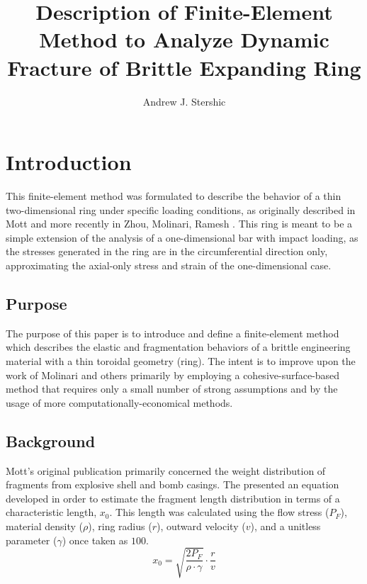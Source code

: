 \documentclass[12pt,a4paper]{article}
\title{Description of Finite-Element Method to Analyze Dynamic Fracture of Brittle Expanding Ring}
\author{Andrew J. Stershic}
\begin{document}
\maketitle

\section{Introduction}

This finite-element method was formulated to describe the behavior of a thin two-dimensional ring under specific loading conditions, as originally described in Mott \cite{Mott1947} and more recently in Zhou, Molinari, Ramesh \cite{ZhouCMS2006}. This ring is meant to be a simple extension of the analysis of a one-dimensional bar with impact loading, as the stresses generated in the ring are in the circumferential direction only, approximating the axial-only stress and strain of the one-dimensional case.

\subsection{Purpose}

The purpose of this paper is to introduce and define a finite-element method which describes the elastic and fragmentation behaviors of a brittle engineering material with a thin toroidal geometry (ring). The intent is to improve upon the work of Molinari and others primarily by employing a cohesive-surface-based method that requires only a small number of strong assumptions and by the usage of more computationally-economical methods.

\subsection{Background}

Mott's original publication \cite{Mott1947} primarily concerned the weight distribution of fragments from explosive shell and bomb casings. The presented an equation developed in order to estimate the fragment length distribution in terms of a characteristic length, $x_{0}$. This length was calculated using the flow stress ($P_{F}$), material density ($\rho$), ring radius ($r$), outward velocity ($v$), and a unitless parameter ($\gamma$) once taken as $100$.
\begin{equation}
x_{0} = \sqrt{\frac{2 P_{F}}{\rho \cdot \gamma}} \cdot \frac{r}{v}
\label{eq:Mott}
\end{equation}
\end{document}

